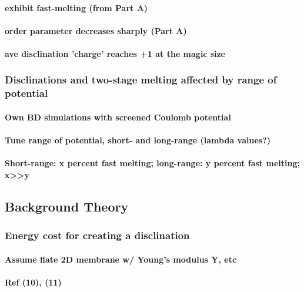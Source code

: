 \documentclass{umthesis}
\begin{document}
\paragraph{exhibit fast-melting (from Part A)}
\label{sec-2.1.4.1.2}
\paragraph{order parameter decreases sharply (Part A)}
\label{sec-2.1.4.1.3}
\paragraph{ave disclination 'charge' reaches +1 at the magic size}
\label{sec-2.1.4.1.4}
\subsubsection{Disclinations and two-stage melting affected by range of potential}
\label{sec-2.1.4.2}
\paragraph{Own BD simulations with screened Coulomb potential}
\label{sec-2.1.4.2.1}
\paragraph{Tune range of potential, short- and long-range (lambda values?)}
\label{sec-2.1.4.2.2}
\paragraph{Short-range: x percent fast melting; long-range: y percent fast melting; x>>y}
\label{sec-2.1.4.2.3}
\subsection{Background Theory}
\label{sec-2.1.5}
\subsubsection{Energy cost for creating a disclination}
\label{sec-2.1.5.1}
\paragraph{Assume flate 2D membrane w/ Young's modulus Y, etc}
\label{sec-2.1.5.1.1}
\paragraph{Ref (10), (11)}
\label{sec-2.1.5.1.2}
\end{document}

